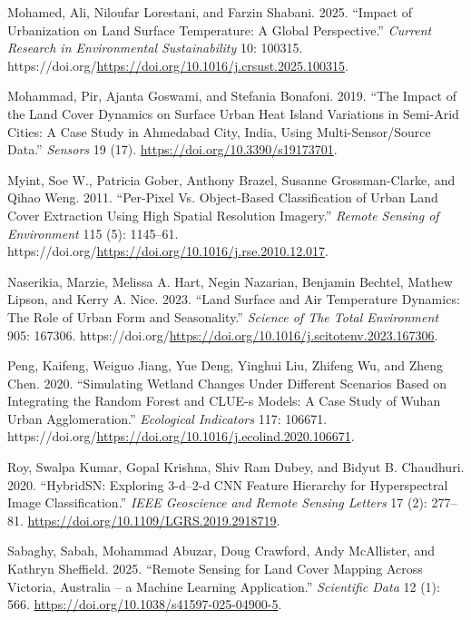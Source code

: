 \documentclass[
  letterpaper,
  DIV=11,
  numbers=noendperiod]{scrreprt}
\newlength{\cslhangindent}
\newenvironment{CSLReferences}[2] %
 {\begin{list}{}{%
  \setlength{\itemindent}{0pt}
  \setlength{\leftmargin}{0pt}
  \setlength{\parsep}{0pt}
  \ifodd #1
   \setlength{\leftmargin}{\cslhangindent}
   \setlength{\itemindent}{-1\cslhangindent}
  \fi
  \setlength{\itemsep}{#2\baselineskip}}}
 {\end{list}}
\begin{document}
\begin{CSLReferences}{1}{0}
Mohamed, Ali, Niloufar Lorestani, and Farzin Shabani. 2025. {``Impact of
Urbanization on Land Surface Temperature: A Global Perspective.''}
\emph{Current Research in Environmental Sustainability} 10: 100315.
https://doi.org/\url{https://doi.org/10.1016/j.crsust.2025.100315}.

Mohammad, Pir, Ajanta Goswami, and Stefania Bonafoni. 2019. {``The
Impact of the Land Cover Dynamics on Surface Urban Heat Island
Variations in Semi-Arid Cities: A Case Study in Ahmedabad City, India,
Using Multi-Sensor/Source Data.''} \emph{Sensors} 19 (17).
\url{https://doi.org/10.3390/s19173701}.

Myint, Soe W., Patricia Gober, Anthony Brazel, Susanne Grossman-Clarke,
and Qihao Weng. 2011. {``Per-Pixel Vs. Object-Based Classification of
Urban Land Cover Extraction Using High Spatial Resolution Imagery.''}
\emph{Remote Sensing of Environment} 115 (5): 1145--61.
https://doi.org/\url{https://doi.org/10.1016/j.rse.2010.12.017}.

Naserikia, Marzie, Melissa A. Hart, Negin Nazarian, Benjamin Bechtel,
Mathew Lipson, and Kerry A. Nice. 2023. {``Land Surface and Air
Temperature Dynamics: The Role of Urban Form and Seasonality.''}
\emph{Science of The Total Environment} 905: 167306.
https://doi.org/\url{https://doi.org/10.1016/j.scitotenv.2023.167306}.

Peng, Kaifeng, Weiguo Jiang, Yue Deng, Yinghui Liu, Zhifeng Wu, and
Zheng Chen. 2020. {``Simulating Wetland Changes Under Different
Scenarios Based on Integrating the Random Forest and CLUE-s Models: A
Case Study of Wuhan Urban Agglomeration.''} \emph{Ecological Indicators}
117: 106671.
https://doi.org/\url{https://doi.org/10.1016/j.ecolind.2020.106671}.

Roy, Swalpa Kumar, Gopal Krishna, Shiv Ram Dubey, and Bidyut B.
Chaudhuri. 2020. {``HybridSN: Exploring 3-d--2-d CNN Feature Hierarchy
for Hyperspectral Image Classification.''} \emph{IEEE Geoscience and
Remote Sensing Letters} 17 (2): 277--81.
\url{https://doi.org/10.1109/LGRS.2019.2918719}.

Sabaghy, Sabah, Mohammad Abuzar, Doug Crawford, Andy McAllister, and
Kathryn Sheffield. 2025. {``Remote Sensing for Land Cover Mapping Across
Victoria, Australia -- a Machine Learning Application.''}
\emph{Scientific Data} 12 (1): 566.
\url{https://doi.org/10.1038/s41597-025-04900-5}.


\end{CSLReferences}
\end{document}
